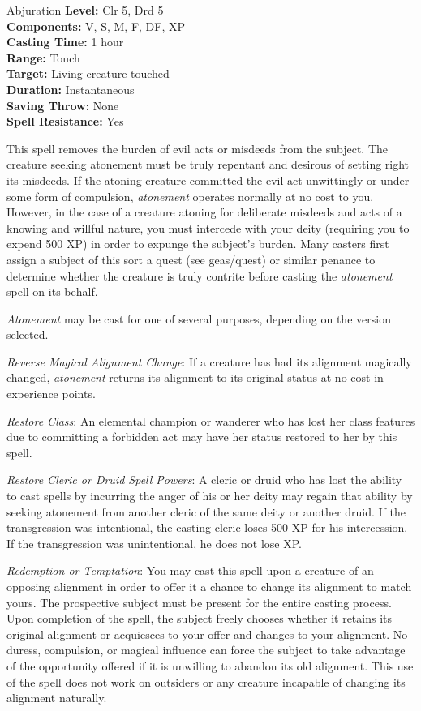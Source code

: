 {Abjuration}
{
	\textbf{Level:}
	Clr 5, Drd 5\\
	\textbf{Components:}
	V, S, M, F, DF, XP\\
	\textbf{Casting Time:}
	1 hour\\
	\textbf{Range:}
	Touch\\
	\textbf{Target:}
	Living creature touched\\
	\textbf{Duration:}
	Instantaneous\\
	\textbf{Saving Throw:}
	None\\
	\textbf{Spell Resistance:}
	Yes\\
}
{
	This spell removes the burden of evil acts or misdeeds from the subject. The creature seeking atonement must be truly repentant and desirous of setting right its misdeeds. If the atoning creature committed the evil act unwittingly or under some form of compulsion, \emph{atonement} operates normally at no cost to you. However, in the case of a creature atoning for deliberate misdeeds and acts of a knowing and willful nature, you must intercede with your deity (requiring you to expend 500 XP) in order to expunge the subject's burden. Many casters first assign a subject of this sort a quest (see geas/quest) or similar penance to determine whether the creature is truly contrite before casting the \emph{atonement} spell on its behalf.

	\emph{Atonement} may be cast for one of several purposes, depending on the version selected.

	\textit{Reverse Magical Alignment Change}:
	If a creature has had its alignment magically changed, \emph{atonement} returns its alignment to its original status at no cost in experience points.

	\textit{Restore Class}:
	An elemental champion or wanderer who has lost her class features due to committing a forbidden act may have her status restored to her by this spell.

	\textit{Restore Cleric or Druid Spell Powers}:
	A cleric or druid who has lost the ability to cast spells by incurring the anger of his or her deity may regain that ability by seeking atonement from another cleric of the same deity or another druid. If the transgression was intentional, the casting cleric loses 500 XP for his intercession. If the transgression was unintentional, he does not lose XP.

	\textit{Redemption or Temptation}:
	You may cast this spell upon a creature of an opposing alignment in order to offer it a chance to change its alignment to match yours. The prospective subject must be present for the entire casting process. Upon completion of the spell, the subject freely chooses whether it retains its original alignment or acquiesces to your offer and changes to your alignment. No duress, compulsion, or magical influence can force the subject to take advantage of the opportunity offered if it is unwilling to abandon its old alignment. This use of the spell does not work on outsiders or any creature incapable of changing its alignment naturally.

}
